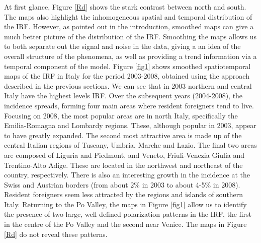 At first glance, Figure \ref{Rd} shows the stark contrast between north and south. The maps also highlight the inhomogeneous spatial and temporal distribution of the IRF. However, as pointed out in the introduction, smoothed maps can give a much better picture of the distribution of the IRF. Smoothing the maps allows us to both separate out the signal and noise in the data, giving a an idea of the overall structure of the phenomena, as well as providing a trend information via a temporal component of the model. Figure \ref{fig1} shows smoothed spatiotemporal maps of the IRF in Italy for the period 2003-2008, obtained using the approach described in the previous sections. We can see that in 2003 northern and central Italy have the highest levels IRF. Over the subsequent years (2004-2008), the incidence spreads, forming four main areas where resident foreigners tend to live. Focusing on 2008, the most popular areas are in north Italy, specifically the Emilia-Romagna and Lombardy regions. These, although popular in 2003, appear to have greatly expanded. The second most attractive area is made up of the central Italian regions of Tuscany, Umbria, Marche and Lazio. The final two areas are composed of Liguria and Piedmont, and Veneto, Friuli-Venezia Giulia and Trentino-Alto Adige. These are located in the northwest and northeast of the country, respectively. There is also an interesting growth in the incidence at the Swiss and Austrian borders (from about 2\% in 2003 to about 4-5\% in 2008). Resident foreigners seem less attracted by the regions and islands of southern Italy. Returning to the Po Valley, the maps in Figure \ref{fig1} allow us to identify the presence of two large, well defined polarization patterns in the IRF, the first in the centre of the Po Valley and the second near Venice. The maps in Figure \ref{Rd} do not reveal these patterns.

